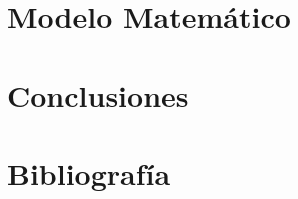 \documentclass[letter, 10pt]{article}
\begin{document}
\section{Modelo Matemático} \label{model}


\section{Conclusiones} \label{conclutions}


\section{Bibliografía}



\end{document}
